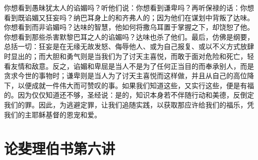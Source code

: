 你想看到愚昧犹太人的谄媚吗？听他们说：你想看到谦卑吗？再听保禄的话：你想看到既谄媚又狂妄吗？纳巴耳身上的和齐弗人的；因为他们在谋划中背叛了达味。你想看到而非谄媚吗？达味的智慧，他如何将撒乌耳置于掌握之下，却饶恕了他。你想看到那些杀害默黎巴耳之人的谄媚吗？达味也杀了他们。最后，仿佛是纲要，总括一切：狂妄是在无缘无故发怒、侮辱他人、或为自己报复、或以不义方式放肆时显出的；而大胆和勇气则是当我们为了讨天主喜悦，而敢于面对危险和死亡，轻看友情和敌意。反之，谄媚和卑屈是当人不是为了任何正当目的而奉承别人，而是贪求今世的事物时；谦卑则是当人为了讨天主喜悦而这样做，并且从自己的高位降下，以便成就一件伟大而可赞叹的事。如果我们知道这些，又实行这些，便是有福的。因为仅仅知道还不够，圣经说：是的，知识本身若不伴随行动和美德，反倒定我们的罪。因此，为逃避定罪，让我们追随实践，以获取那应许给我们的福乐，凭我们的主耶稣基督的恩宠和爱。\par



\section{论斐理伯书第六讲}

\par

\par

